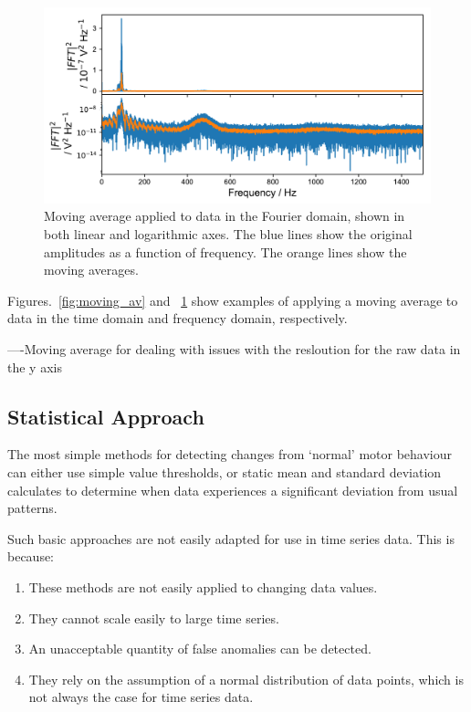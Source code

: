 \begin{figure}[t]
    \includegraphics[width=1.0\textwidth]{fig/freq_moving_average.pdf}
    \caption[Moving Average in Fourier Domain]{Moving average applied to data in the Fourier domain, shown in both linear and logarithmic axes. The blue lines show the original amplitudes as a function of frequency. The orange lines show the moving averages.}
    \label{fig:freq_moving_av}
\end{figure}

Figures.~\ref{fig:moving_av} and ~\ref{fig:freq_moving_av} show examples of applying a moving average to data in the time domain and frequency domain, respectively. 


----Moving average for dealing with issues with the resloution for the raw data in the y axis

\subsection{Statistical Approach}

The most simple methods for detecting changes from `normal' motor behaviour can either use simple value thresholds, or static mean and standard deviation calculates to determine when data experiences a significant deviation from usual patterns. 

Such basic approaches are not easily adapted for use in time series data. This is because:

\begin{enumerate}
    \item These methods are not easily applied to changing data values.
    \item They cannot scale easily to large time series.
    \item An unacceptable quantity of false anomalies can be detected.
    \item They rely on the assumption of a normal distribution of data points, which is not always the case for time series data.
\end{enumerate}

